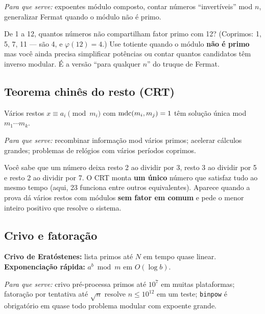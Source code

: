 \emph{Para que serve:} expoentes módulo composto, contar números ``invertíveis'' mod $n$, generalizar Fermat quando o módulo não é primo.

\begin{exemplodiabox}
De 1 a 12, quantos números não compartilham fator primo com 12? (Coprimos: 1, 5, 7, 11 --- são 4, e $\varphi(12)=4$.) Use totiente quando o módulo \textbf{não é primo} mas você ainda precisa simplificar potências ou contar quantos candidatos têm inverso modular. É a versão ``para qualquer $n$'' do truque de Fermat.
\end{exemplodiabox}



\subsection{Teorema chinês do resto (CRT)}

Vários restos $x \equiv a_i \pmod{m_i}$ com $\operatorname{mdc}(m_i,m_j)=1$ têm solução única mod $m_1\cdots m_k$.

\emph{Para que serve:} recombinar informação mod vários primos; acelerar cálculos grandes; problemas de relógios com vários períodos coprimos.

\begin{exemplodiabox}
Você sabe que um número deixa resto 2 ao dividir por 3, resto 3 ao dividir por 5 e resto 2 ao dividir por 7. O CRT monta \textbf{um único} número que satisfaz tudo ao mesmo tempo (aqui, 23 funciona entre outros equivalentes). Aparece quando a prova dá vários restos com módulos \textbf{sem fator em comum} e pede o menor inteiro positivo que resolve o sistema.
\end{exemplodiabox}



\subsection{Crivo e fatoração}

\textbf{Crivo de Eratóstenes:} lista primos até $N$ em tempo quase linear.
\textbf{Exponenciação rápida:} $a^b \bmod m$ em $O(\log b)$.

\emph{Para que serve:} crivo pré-processa primos até $10^7$ em muitas plataformas; fatoração por tentativa até $\sqrt{n}$ resolve $n \le 10^{12}$ em um teste; \texttt{binpow} é obrigatório em quase todo problema modular com expoente grande.

